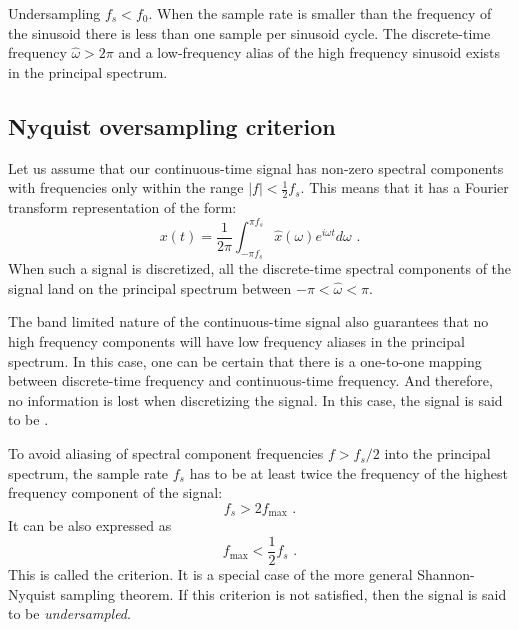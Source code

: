 \begin{marginfigure}
\begin{center}
  \end{center}
  \caption{Undersampling $f_s < f_0$. When the sample rate is smaller than the frequency of the 
  sinusoid there is less than one sample per sinusoid cycle. The discrete-time frequency 
  $\hat{\omega}>2\pi$ and a low-frequency alias of the high frequency sinusoid exists 
  in the principal spectrum.}
  \label{fig:undersampling}
\end{marginfigure}

\subsection{Nyquist oversampling criterion}
Let us assume that our continuous-time signal has non-zero spectral components with 
frequencies only within the range $|f|<\frac{1}{2}f_s$. This means that it has a 
Fourier transform representation of the form:
\begin{equation}
  x(t) = \frac{1}{2\pi}\int_{-\pi f_s}^{\pi f_s} \hat{x}(\omega)
  e^{i\omega t}d\omega\,\,.
\end{equation}
When such a signal is discretized, all the discrete-time spectral components of the 
signal land on the principal spectrum between $-\pi <\hat{\omega} < \pi$.

The band limited nature of the continuous-time signal also guarantees that no high frequency 
components will have low frequency aliases in the principal spectrum.
In this case, one can be certain that there is a one-to-one mapping between discrete-time 
frequency and continuous-time frequency. And therefore, no information is lost when discretizing the signal. 
In this case, the signal is said to be \emph{}.

To avoid aliasing of spectral component frequencies $f>f_s/2$ into the principal spectrum, 
the sample rate $f_s$ has to be at least twice the frequency of the highest frequency 
component of the signal:
\begin{equation}
  \boxed{
    f_s > 2f_{\mathrm{max}}
  }\,\,.
\end{equation}
It can be also expressed as
\begin{equation}
  \boxed{
    f_{\mathrm{max}}<\frac{1}{2}f_s
  }\,\,.
\end{equation}
This is called the \emph{} criterion. 
It is a special case of the more general Shannon-Nyquist sampling theorem.
If this criterion is not satisfied, then the signal is said to be \emph{undersampled}.


